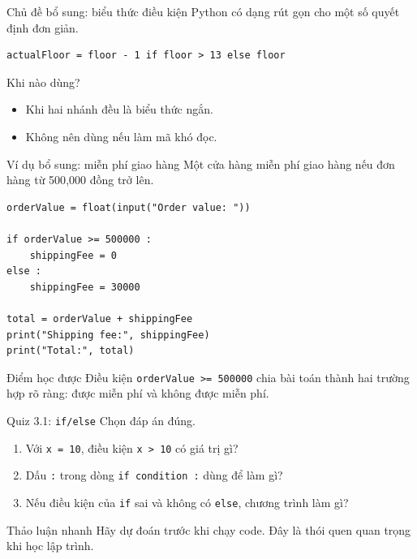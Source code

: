 \documentclass[aspectratio=169,11pt]{beamer}
\newcommand{\code}[1]{\texttt{#1}}
\newcommand{\smallgap}{\vspace{0.4em}}
\begin{document}
\begin{frame}[fragile]{Chủ đề bổ sung: biểu thức điều kiện}
Python có dạng rút gọn cho một số quyết định đơn giản.
\begin{lstlisting}[style=py]
actualFloor = floor - 1 if floor > 13 else floor
\end{lstlisting}
\smallgap
\begin{block}{Khi nào dùng?}
\begin{itemize}
  \item Khi hai nhánh đều là biểu thức ngắn.
  \item Không nên dùng nếu làm mã khó đọc.
\end{itemize}
\end{block}
\end{frame}



\begin{frame}[fragile]{Ví dụ bổ sung: miễn phí giao hàng}
Một cửa hàng miễn phí giao hàng nếu đơn hàng từ 500{,}000 đồng trở lên.
\begin{lstlisting}[style=py]
orderValue = float(input("Order value: "))

if orderValue >= 500000 :
    shippingFee = 0
else :
    shippingFee = 30000

total = orderValue + shippingFee
print("Shipping fee:", shippingFee)
print("Total:", total)
\end{lstlisting}
\begin{block}{Điểm học được}
Điều kiện \code{orderValue >= 500000} chia bài toán thành hai trường hợp rõ ràng: được miễn phí và không được miễn phí.
\end{block}
\end{frame}

\begin{frame}{Quiz 3.1: \texttt{if/else}}
Chọn đáp án đúng.
\begin{enumerate}
  \item Với \code{x = 10}, điều kiện \code{x > 10} có giá trị gì?
  \item Dấu \code{:} trong dòng \code{if condition :} dùng để làm gì?
  \item Nếu điều kiện của \code{if} sai và không có \code{else}, chương trình làm gì?
\end{enumerate}
\vspace{0.5em}
\begin{exampleblock}{Thảo luận nhanh}
Hãy dự đoán trước khi chạy code. Đây là thói quen quan trọng khi học lập trình.
\end{exampleblock}
\end{frame}
\end{document}
